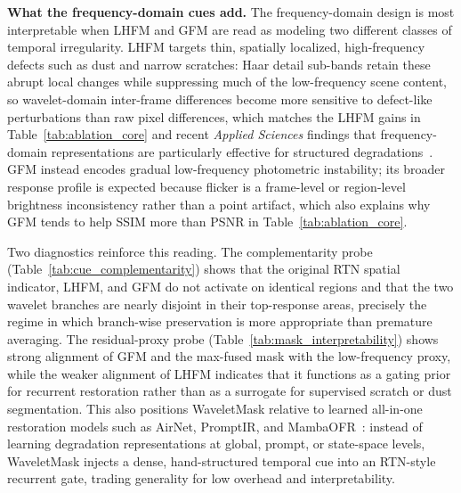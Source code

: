 \documentclass[applsci,article,submit,pdftex,moreauthors]{Definitions/mdpi}
\begin{document}
\textbf{What the frequency-domain cues add.}
The frequency-domain design is most interpretable when LHFM and GFM are read as modeling two different classes of temporal irregularity. LHFM targets thin, spatially localized, high-frequency defects such as dust and narrow scratches: Haar detail sub-bands retain these abrupt local changes while suppressing much of the low-frequency scene content, so wavelet-domain inter-frame differences become more sensitive to defect-like perturbations than raw pixel differences, which matches the LHFM gains in Table~\ref{tab:ablation_core} and recent \textit{Applied Sciences} findings that frequency-domain representations are particularly effective for structured degradations~\cite{kim2025hybrid,park2025spatialfrequency}. GFM instead encodes gradual low-frequency photometric instability; its broader response profile is expected because flicker is a frame-level or region-level brightness inconsistency rather than a point artifact, which also explains why GFM tends to help SSIM more than PSNR in Table~\ref{tab:ablation_core}.

Two diagnostics reinforce this reading. The complementarity probe (Table~\ref{tab:cue_complementarity}) shows that the original RTN spatial indicator, LHFM, and GFM do not activate on identical regions and that the two wavelet branches are nearly disjoint in their top-response areas, precisely the regime in which branch-wise preservation is more appropriate than premature averaging. The residual-proxy probe (Table~\ref{tab:mask_interpretability}) shows strong alignment of GFM and the max-fused mask with the low-frequency proxy, while the weaker alignment of LHFM indicates that it functions as a gating prior for recurrent restoration rather than as a surrogate for supervised scratch or dust segmentation. This also positions WaveletMask relative to learned all-in-one restoration models such as AirNet, PromptIR, and MambaOFR~\cite{li2022airnet,potlapalli2023promptir,mao2025mambaofr}: instead of learning degradation representations at global, prompt, or state-space levels, WaveletMask injects a dense, hand-structured temporal cue into an RTN-style recurrent gate, trading generality for low overhead and interpretability.
\end{document}
